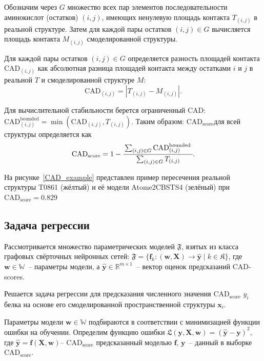 \documentclass[14pt]{extarticle}
\begin{document}
Обозначим через $G$ множество всех пар элементов последовательности аминокислот (остатков)  $(i, j)$, имеющих ненулевую площадь контакта $T_{(i, j)}$ в реальной структуре. Затем для каждой пары остатков $(i, j)\in G$ вычисляется площадь контакта $M_{(i, j)}$ смоделированной структуры. 



Для каждой пары остатков $(i, j) \in G$ определяется разность площадей контакта $\mathrm{CAD}_{(i, j)}$ как абсолютная разница площадей контакта между остатками $i$ и $j$ в реальной $T$ и смоделированной структуре $M$:
$$\mathrm{CAD}_{(i, j)}=\left|T_{(i, j)}-M_{(i, j)}\right|.$$

Для вычислительной стабильности берется ограниченный CAD: $\mathrm{CAD}_{(i, j)}^{\text {bounded}}=\min \left(\mathrm{CAD}_{(i, j)}, T_{(i, j)}\right)$. Таким образом:
$\text{CAD}_\text{score}$для всей структуры определяется как
\begin{align*}
\mathrm{CAD}_\text{score}=1-\cfrac{\sum_{(i, j) \in G} \mathrm{CAD}_{(i, j)}^{\text {bounded }}}{\sum_{(i, j) \in G} T_{(i, j)}}.
\end{align*}

На рисунке~\ref{CAD_example} представлен пример пересечения реальной структуры T0861 (жёлтый) и её модели Atome2\textunderscore CBS\textunderscore TS4 (зелёный) при $\mathrm{CAD}_\text{score}=0.829$

\subsection{Задача регрессии}

Рассмотривается множество параметрических моделей $\mathfrak{F}$, взятых из класса графовых свёрточных нейронных сетей: $\mathfrak{F} = \{\mathbf{f}_k\colon(\mathbf{w}, \mathbf{X})\to  \mathbf{\hat{y}}\mid k \in \mathfrak{K}\}$, где $\mathbf{w} \in \mathbb{W}$~-- параметры модели, а $\hat{\mathbf{y}}\in \mathbb{R}^{m\times 1}$~-- вектор оценок предсказаний CAD-scores. 

Решается задача регрессии для предсказания численного значения $\text{CAD}_\text{score}$ $y_i$ белка на основе его смоделированной пространственной структуры $\mathbf{x}_i$.

Параметры модели $\mathbf{w}\in \mathbb{W}$ подбираются в соответствии с минимизацией функции ошибки на обучении. Определим функцию ошибки
$\mathfrak{L}(\mathbf{y}, \mathbf{X}, \mathbf{w}) =\left( \mathbf{\hat{y}} - \mathbf{y} \right)^{2}$, где $\mathbf{\hat{y}} = \mathbf{f} (\mathbf{X},\mathbf{w})$-- $\text{CAD}_\text{score}$ предсказанный моделью $\mathbf{f}$, $\mathbf{y}$~-- данный в выборке $\text{CAD}_\text{score}$.
\end{document}
